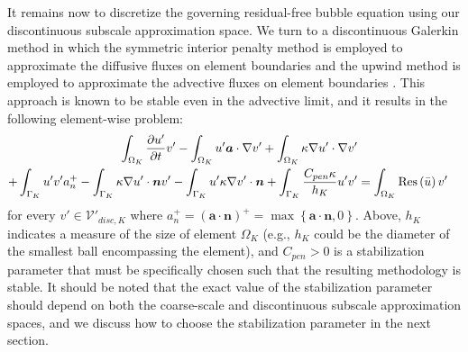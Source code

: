 \documentclass[11pt]{article}
\begin{document}
It remains now to discretize the governing residual-free bubble equation using our discontinuous subscale approximation space.  We turn to a discontinuous Galerkin method in which the symmetric interior penalty method is employed to approximate the diffusive fluxes on element boundaries and the upwind method is employed to approximate the advective fluxes on element boundaries \cite{Shu2009}.  This approach is known to be stable even in the advective limit, and it results in the following element-wise problem:
\begin{equation}
\begin{aligned}
\int_{\Omega_K} \frac{\partial u'}{\partial t} v' -  \int_{\Omega_K} u' \bm{a} \cdot \nabla v' + \int_{\Omega_K} \kappa \nabla u' \cdot \nabla v' \\ + \int_{\Gamma_K} u' v' a_n^+ - \int_{\Gamma_K} \kappa \nabla u' \cdot \bm{n} v' - \int_{\Gamma_K} u' \kappa \nabla v' \cdot \bm{n} + \int_{\Gamma_K} \frac{C_{pen} \kappa}{h_K} u' v' &= \int_{\Omega_K} \textup{Res}\left(\bar{u}\right) v'
\end{aligned}
\end{equation}
for every $v' \in \mathcal{V}'_{disc,K}$ where $a^+_n = \left(\bm{a} \cdot \bm{n}\right)^+ = \max\left\{ \bm{a} \cdot \bm{n}, 0 \right\}$.  Above, $h_K$ indicates a measure of the size of element $\Omega_K$ (e.g., $h_K$ could be the diameter of the smallest ball encompassing the element), and $C_{pen} > 0$ is a stabilization parameter that must be specifically chosen such that the resulting methodology is stable.  It should be noted that the exact value of the stabilization parameter should depend on both the coarse-scale and discontinuous subscale approximation spaces, and we discuss how to choose the stabilization parameter in the next section.
\end{document}

